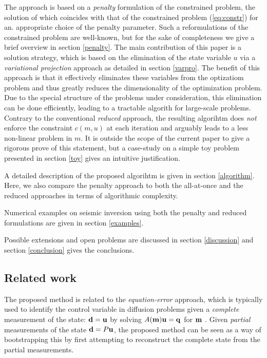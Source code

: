 \documentclass{iopart}
\begin{document}
The approach is based on a \emph{penalty} formulation of the constrained problem,
the solution of which coincides with that of the constrained problem (\ref{eq:constr}) for an. 
appropriate choice of the penalty parameter.
Such a reformulations of the constrained problem are well-known, 
but for the sake of completeness we give a brief overview in section \ref{penalty}. The main contribution
of this paper is a solution strategy, which is based on the elimination of the state variable $u$ via
a \emph{variational projection} approach as detailed in section \ref{varpro}. The benefit of this approach is
that it effectively eliminates these variables from the optizatiom problem and thus greatly reduces the dimensionality
of the optimization problem. Due to the special structure of the problems under consideration, this elimination 
can be done efficiently, leading to a tractable algorith for large-scale problems. 
Contrary to the conventional \emph{reduced} approach, the resulting algorihtm does \emph{not} enforce the constraint
$c(m,u)$ at each iteration and arguably leads to a less non-linear problem in $m$. It is outside the scope of the current
paper to give a rigorous prove of this statement, but a case-study on a simple toy problem presented in section
 \ref{toy} gives an intuitive justification.

A detailed description of the proposed algorihtm is given in section \ref{algorithm}.
Here, we also compare the penalty approach to both the all-at-once and the
reduced approaches in terms of algorithmic complexity.

Numerical
examples on seismic inversion using both the penalty and reduced
formulations are given in section \ref{examples}.

Possible extensions and open problems are discussed in section
\ref{discussion} and section \ref{conclusion} gives the conclusions.

\subsection{Related work}
The proposed method is related to the \emph{equation-error} approach,
which is typically used to identify the control variable in diffusion
problems given a \emph{complete} measurement of the state: $\mathbf{d} = \mathbf{u}$ by
solving $A(\mathbf{m})\mathbf{u} = \mathbf{q}$ for $\mathbf{m}$ \cite{Richter1981,Banerjee2013}. 
Given \emph{partial} measurements of the state $\mathbf{d} = P\mathbf{u}$, the proposed method can be seen as a
way of bootstrapping this by first attempting to reconstruct the complete
state from the partial measurements. 
\end{document}
